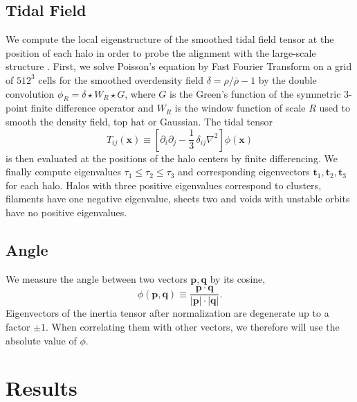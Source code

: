 \documentclass[useAMS,usenatbib]{mn2e}
\begin{document}
\subsection{Tidal Field}
%
We compute the local eigenstructure of the smoothed tidal field tensor at the
position of each halo in order to probe the alignment with the large-scale
structure \citep[cf.][]{Hahn2007b}. First, we solve Poisson's equation by Fast
Fourier Transform on a grid of $512^3$ cells for the smoothed overdensity
field $\delta=\rho/\bar{\rho}-1$ by the double convolution $\phi_R =
\delta\star W_R\star G$, where $G$ is the Green's function of the symmetric
3-point finite difference operator and $W_R$ is the window function of scale
$R$ used to smooth the density field, top hat or Gaussian. The tidal tensor
%
\begin{equation}
  T_{ij}(\mathbf{x}) \equiv
  \left[\partial_i\partial_j-\frac{1}{3}\,\delta_{ij}\nabla^2\right]
  \phi(\mathbf{x})
  \label{TidalField}
\end{equation}
%
is then evaluated at the positions of the halo centers by finite
differencing. We finally compute eigenvalues $\tau_1\leq\tau_2\leq\tau_3$ and
corresponding eigenvectors $\mathbf{t}_1,\mathbf{t}_2,\mathbf{t}_3$ for each
halo. Halos with three positive eigenvalues correspond to clusters, filaments
have one negative eigenvalue, sheets two and voids with unstable orbits have
no positive eigenvalues.
%
\subsection{Angle}
We measure the angle between two vectors $\mathbf{p},\mathbf{q}$ by its
cosine,
%
\begin{equation}
  \phi(\mathbf{p},\mathbf{q})\equiv
	\frac{\mathbf{p}\cdot\mathbf{q}}{|\mathbf{p}|\cdot|\mathbf{q}|}.
\end{equation}
%
Eigenvectors of the inertia tensor after normalization are degenerate up to a
factor $\pm1$. When correlating them with other vectors, we therefore will use
the absolute value of $\phi$.
%
%
\section{Results}
\label{chap:res}
%
\end{document}

